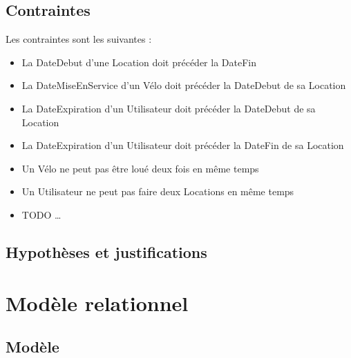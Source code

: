 \documentclass[a4paper,10pt]{report}
\begin{document}
\section{Contraintes}
Les contraintes sont les suivantes :
\begin{itemize}
  \item La DateDebut d'une Location doit précéder la DateFin 
  \item La DateMiseEnService d'un Vélo doit précéder la DateDebut de sa Location
  \item La DateExpiration d'un Utilisateur doit précéder la DateDebut de sa Location
  \item La DateExpiration d'un Utilisateur doit précéder la DateFin de sa Location
  \item Un Vélo ne peut pas être loué deux fois en même temps
  \item Un Utilisateur ne peut pas faire deux Locations en même temps
  \item TODO \ldots
\end{itemize}
\section{Hypothèses et justifications}

\chapter{Modèle relationnel}
\section{Modèle}
\end{document}
